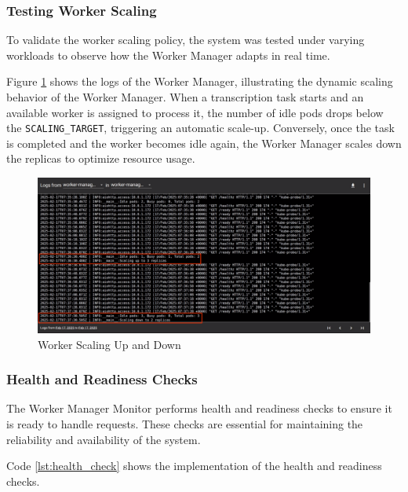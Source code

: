 \subsubsection{Testing Worker Scaling}
To validate the worker scaling policy, the system was tested under varying workloads to observe how the Worker Manager adapts in real time.

Figure \ref{fig:worker_scaling_up_down} shows the logs of the Worker Manager, illustrating the dynamic scaling behavior of the Worker Manager. When a transcription task starts and an available worker is assigned to process it, the number of idle pods drops below the \texttt{SCALING\_TARGET}, triggering an automatic scale-up. Conversely, once the task is completed and the worker becomes idle again, the Worker Manager scales down the replicas to optimize resource usage.

\begin{figure}[H]
  \centering
  \includegraphics[width=\textwidth]{figures/worker_scaling_up_down.png}
  \caption{Worker Scaling Up and Down}
  \label{fig:worker_scaling_up_down}
\end{figure}

\subsubsection{Health and Readiness Checks}
The Worker Manager Monitor performs health and readiness checks to ensure it is ready to handle requests. These checks are essential for maintaining the reliability and availability of the system. 

Code \ref{lst:health_check} shows the implementation of the health and readiness checks.

